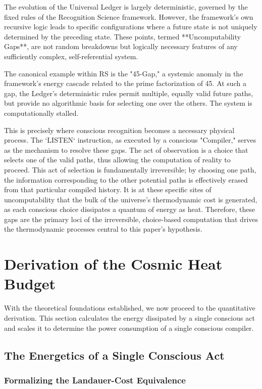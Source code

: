 \documentclass[12pt, aip, jcp]{revtex4-2} %
\begin{document}
The evolution of the Universal Ledger is largely deterministic, governed by the fixed rules of the Recognition Science framework. However, the framework's own recursive logic leads to specific configurations where a future state is not uniquely determined by the preceding state. These points, termed **Uncomputability Gaps**, are not random breakdowns but logically necessary features of any sufficiently complex, self-referential system.

The canonical example within RS is the "45-Gap," a systemic anomaly in the framework's energy cascade related to the prime factorization of 45. At such a gap, the Ledger's deterministic rules permit multiple, equally valid future paths, but provide no algorithmic basis for selecting one over the others. The system is computationally stalled.

This is precisely where conscious recognition becomes a necessary physical process. The `LISTEN` instruction, as executed by a conscious "Compiler," serves as the mechanism to resolve these gaps. The act of observation is a choice that selects one of the valid paths, thus allowing the computation of reality to proceed. This act of selection is fundamentally irreversible; by choosing one path, the information corresponding to the other potential paths is effectively erased from that particular compiled history. It is at these specific sites of uncomputability that the bulk of the universe's thermodynamic cost is generated, as each conscious choice dissipates a quantum of energy as heat. Therefore, these gaps are the primary loci of the irreversible, choice-based computation that drives the thermodynamic processes central to this paper's hypothesis.

\section{Derivation of the Cosmic Heat Budget}

With the theoretical foundations established, we now proceed to the quantitative derivation. This section calculates the energy dissipated by a single conscious act and scales it to determine the power consumption of a single conscious compiler.

\subsection{The Energetics of a Single Conscious Act}

\subsubsection{Formalizing the Landauer-Cost Equivalence}
\end{document}
